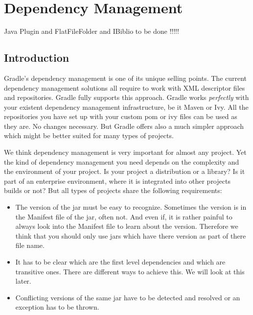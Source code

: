 \chapter{Dependency Management}
\label{cha:dependency_management}
Java Plugin and FlatFileFolder and IBiblio to be done !!!!!
\section{Introduction} %
\label{sec:Introduction}
Gradle's dependency management is one of its unique selling points. The current dependency management solutions all require to work with XML descriptor files and repositories. Gradle fully supports this approach. Gradle works \emph{perfectly} with your existent dependency management infrastructure, be it Maven or Ivy. All the repositories you have set up with your custom pom or ivy files can be used as they are. No changes necessary. But Gradle offers also a much simpler approach which might be better suited for many types of projects. 

We think dependency management is very important for almost any project. Yet the kind of dependency management you need depends on the complexity and the environment of your project. Is your project a distribution or a library? Is it part of an enterprise environment, where it is integrated into other projects builds or not? But all types of projects share the following requirements:
\begin{itemize}
\item The version of the jar must be easy to recognize. Sometimes the version is in the Manifest file of the jar, often not. And even if, it is rather painful to always look into the Manifest file to learn about the version. Therefore we think that you should only use jars which have there version as part of there file name.
\item It has to be clear which are the first level dependencies and which are transitive ones. There are different ways to achieve this. We will look at this later.
\item Conflicting versions of the same jar have to be detected and resolved or an exception has to be thrown.
\end{itemize}

